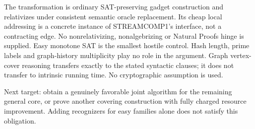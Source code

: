 \documentclass[11pt]{article}
\begin{document}
The transformation is ordinary SAT-preserving gadget construction and
relativizes under consistent semantic oracle replacement. Its cheap
local addressing is a concrete instance of STREAMCOMP1's interface,
not a contracting edge. No nonrelativizing, nonalgebrizing or Natural
Proofs hinge is supplied. Easy monotone SAT is the smallest hostile
control. Hash length, prime labels and graph-history multiplicity play
no role in the argument. Graph vertex-cover reasoning transfers exactly
to the stated syntactic clauses; it does not transfer to intrinsic
running time. No cryptographic assumption is used.

Next target: obtain a genuinely favorable joint algorithm for the
remaining general core, or prove another covering construction with
fully charged resource improvement. Adding recognizers for easy families
alone does not satisfy this obligation.
\end{document}
